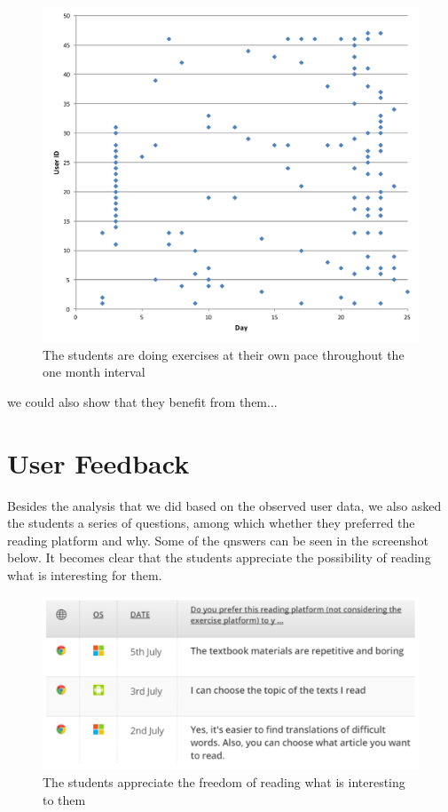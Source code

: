 \begin{figure}[h!]
\centering
  \includegraphics[width=\columnwidth]{figures/user_exercise_activity_vs_day.pdf}
  \caption{The students are doing exercises at their own pace throughout the one month interval }
\end{figure}

we could also show that they benefit from them... 



\section{User Feedback}

Besides the analysis that we did based on the observed user data, we also asked the students a series of questions, among which whether they preferred the reading platform and why. Some of the qnswers can be seen in the screenshot below. It becomes clear that the students appreciate the possibility of reading what is interesting for them.

    \begin{figure}[h!]
    \centering
      \includegraphics[width=0.9\columnwidth]{figures/opinion_on_reading_platform}
      \caption{The students appreciate the freedom of reading what is interesting to them }
    \end{figure}

